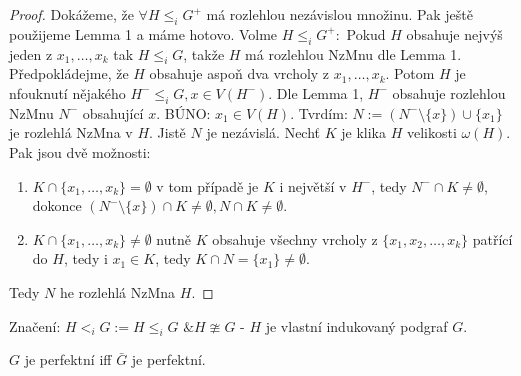 \begin{proof}
	Dokážeme, že $\forall H \leq_{i} G^{+}$ má rozlehlou nezávislou množinu. Pak ještě použijeme Lemma 1 a máme hotovo. Volme $H \leq_{i} G^{+}:$ Pokud $H$ obsahuje nejvýš jeden z $x_{1}, \dots, x_{k}$ tak $H \leq_{i} G$, takže $H$ má rozlehlou NzMnu dle Lemma 1. Předpokládejme, že $H$ obsahuje aspoň dva vrcholy z $x_{1}, \dots, x_{k}$. Potom $H$ je nfouknutí nějakého $H^{-} \leq_{i} G, x \in V(H^{-})$. Dle Lemma 1, $H^{-}$ obsahuje rozlehlou NzMnu $N^{-}$ obsahující $x$. BÚNO: $x_{1} \in V(H)$. Tvrdím: $N := (N^{-} \setminus \{x\}) \cup \{x_{1}\}$ je rozlehlá NzMna v $H$. Jistě $N$ je nezávislá. Nechť $K$ je klika $H$ velikosti $\omega(H)$. Pak jsou dvě možnosti:
	
	\begin{enumerate}
		\item $K \cap \{x_{1}, \dots, x_{k}\} = \emptyset$ v tom případě je $K$ i největší v $H^{-}$, tedy $N^{-} \cap K \neq \emptyset$, dokonce $(N^{-} \setminus \{x\}) \cap K \neq \emptyset, N \cap K \neq \emptyset$.
		\item $K \cap \{x_{1}, \dots, x_{k}\} \neq \emptyset$ nutně $K$ obsahuje všechny vrcholy z $\{x_{1}, x_{2}, \dots ,x_{k}\}$ patřící do $H$, tedy i $x_{1} \in K$, tedy $K \cap N = \{x_{1}\} \neq \emptyset$.
	\end{enumerate}
	
	Tedy $N$ he rozlehlá NzMna $H$.
\end{proof}

\begin{definice}
	Značení: $H <_{i} G := H \leq_{i} G \text{ \& } H \ncong G$ - $H$ je vlastní indukovaný podgraf $G$.
\end{definice}

\begin{veta}
	$G$ je perfektní iff $\bar{G}$ je perfektní.
\end{veta}

